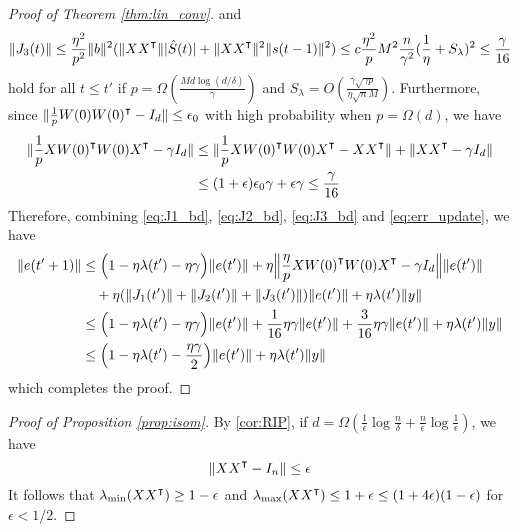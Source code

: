 \begin{proof}[Proof of Theorem \ref{thm:lin_conv}]
and
\begin{equation}
\label{eq:J3_bd}
\|J_3(t)\| \leq \frac{\eta^2}{p^2}\|b\|^2(\|XX\transpose\| |\hat{S}(t)|+\|XX\transpose\|^2 \|s(t-1)\|^2) \leq c\frac{\eta^2}{p}M^2 \frac{n}{\gamma^2}(\frac{1}{\eta}+S_\lambda)^2\leq \frac{\gamma}{16}
\end{equation}
hold for all $t\leq t'$ if $p = \Omega(\frac{Md\log(d/\delta)}{\gamma})$ and $S_\lambda = O(\frac{\gamma\sqrt{\gamma p}}{\eta\sqrt{n}M})$. Furthermore, since $\|\frac{1}{p}W(0)W(0)\transpose-I_d\|\leq \epsilon_0$ with high probability when $p=\Omega(d)$, we have
\begin{equation}
\label{eq:xwwx_bd}
\begin{aligned}
\|\frac{1}{p}XW(0)\transpose W(0)X\transpose-\gamma I_d\|
&\leq \|\frac{1}{p}XW(0)\transpose W(0)X\transpose-XX\transpose\| + \|XX\transpose-\gamma I_d\|  \\
&\leq (1+\epsilon)\epsilon_0\gamma+\epsilon\gamma \leq \frac{\gamma}{16}
\end{aligned}
\end{equation}
Therefore, combining \eqref{eq:J1_bd}, \eqref{eq:J2_bd}, \eqref{eq:J3_bd} and \eqref{eq:err_update}, we have
\begin{equation*}
\begin{aligned}
       \|e(t'+1)\|
       &\leq \Big(1-\eta\lambda(t')-\eta\gamma\Big) \|e(t')\| + \eta\Big\|\frac{\eta}{p}XW(0)\transpose W(0)X\transpose-\gamma I_d\Big\|\|e(t')\|\\
       &\quad + \eta(\|J_1(t')\|+\|J_2(t')\|+\|J_3(t')\|)\|e(t')\| + \eta\lambda(t')\|y\| \\
       &\leq \Big(1-\eta\lambda(t')-\eta\gamma\Big)\|e(t')\| + \frac{1}{16}\eta\gamma\|e(t')\|+ \frac{3}{16}\eta\gamma\|e(t')\|  + \eta\lambda(t')\|y\| \\
       &\leq\Big(1-\eta\lambda(t')-\frac{\eta\gamma}{2}\Big)\|e(t')\| +  \eta\lambda(t')\|y\|
\end{aligned}
\end{equation*}
which completes the proof.
\end{proof}


\begin{proof}[Proof of Proposition \ref{prop:isom}]
By \cref{cor:RIP}, if $d=\Omega(\frac{1}{\epsilon}\log\frac{n}{\delta}+\frac{n}{\epsilon}\log \frac{1}{\epsilon})$, we have
\begin{equation*}
\|XX\transpose - I_n\|\leq \epsilon
\end{equation*}
It follows that $\lambda_{\min}(XX\transpose)\geq 1-\epsilon$ and $\lambda_{\max}(XX\transpose)\leq 1+\epsilon \leq (1+4\epsilon)(1-\epsilon)$ for $\epsilon <1/2$.
\end{proof}


